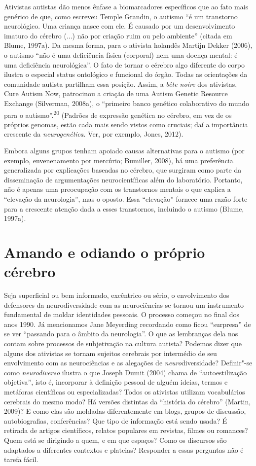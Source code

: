 Ativistas autistas dão menos ênfase a biomarcadores específicos que ao
fato mais genérico de que, como escreveu Temple Grandin, o autismo ``é
um transtorno neurológico. Uma criança nasce com ele. É causado por um
desenvolvimento imaturo do cérebro (...) não por criação ruim ou pelo
ambiente'' (citada em Blume, 1997a). Da mesma forma, para o ativista
holandês Martijn Dekker (2006), o autismo ``não é uma deficiência física
(corporal) nem uma doença mental: é uma deficiência neurológica''. O
fato de tornar o cérebro algo diferente do corpo ilustra o especial
status ontológico e funcional do órgão. Todas as orientações da
comunidade autista partilham essa posição. Assim, a \emph{bête noire}
dos ativistas, Cure Autism Now, patrocinou a criação de uma Autism
Genetic Resource Exchange (Silverman, 2008a), o ``primeiro banco
genético colaborativo do mundo para o autismo''.\textsuperscript{20}
(Padrões de expressão genética no cérebro, em vez de os próprios
genomas, estão cada mais sendo vistos como cruciais; daí a importância
crescente da \emph{neurogenética}. Ver, por exemplo, Jones, 2012).

Embora alguns grupos tenham apoiado causas alternativas para o autismo
(por exemplo, envenenamento por mercúrio; Bumiller, 2008), há uma
preferência generalizada por explicações baseadas no cérebro, que
surgiram como parte da disseminação de argumentações neurocientíficas
além do laboratório. Portanto, não é apenas uma preocupação com os
transtornos mentais o que explica a ``elevação da neurologia'', mas o
oposto. Essa ``elevação'' fornece uma razão forte para a crescente
atenção dada a esses transtornos, incluindo o autismo (Blume, 1997a).

\chapter{Amando e odiando o próprio cérebro}

Seja superficial ou bem informado, excêntrico ou sério, o envolvimento
dos defensores da neurodiversidade com as neurociências se tornou um
instrumento fundamental de moldar identidades pessoais. O processo
começou no final dos anos 1990. Já mencionamos Jane Meyerding recordando
como ficou ``surpresa'' de se ver ``passando para o âmbito da
neurologia''. O que as lembranças dela nos contam sobre processos de
subjetivação na cultura autista? Podemos dizer que alguns dos ativistas
se tornam sujeitos cerebrais por intermédio de seu envolvimento com as
neurociências e as alegações de \emph{neuro}diversidade? Definir"-se como
\emph{neurodiverso} ilustra o que Joseph Dumit (2004) chama de
``autoestilização objetiva'', isto é, incorporar à definição pessoal de
alguém ideias, termos e metáforas científicas ou especializadas? Todos
os ativistas utilizam vocabulários cerebrais do mesmo modo? Há versões
distintas da ``história do cérebro'' (Martin, 2009)? E como elas são
moldadas diferentemente em blogs, grupos de discussão, autobiografias,
conferências? Que tipo de informação está sendo usada? É retirada de
artigos científicos, relatos populares em revistas, filmes ou romances?
Quem está se dirigindo a quem, e em que espaços? Como os discursos são
adaptados a diferentes contextos e plateias? Responder a essas perguntas
não é tarefa fácil.

